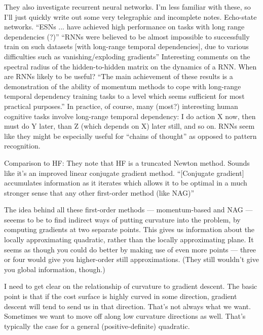 \documentclass[12pt]{report}
\begin{document}
They also investigate recurrent neural networks.  I'm less familiar
with these, so I'll just quickly write out some very telegraphic and
incomplete notes.  Echo-state networks.  ``ESNs ... have achieved high
performance on tasks with long range dependencies (?)''  ``RNNs were
believed to be almost impossible to successfully train on such
datasets [with long-range temporal dependencies], due to various
difficulties such as vanishing/exploding gradients'' Interesting
comments on the spectral radius of the hidden-to-hidden matrix on the
dynamics of a RNN.  When are RNNs likely to be useful?  ``The main
achievement of these results is a demonstration of the ability of
momentum methods to cope with long-range temporal dependency training
tasks to a level which seems sufficient for most practical purposes.''
In practice, of course, many (most?) interesting human cognitive tasks
involve long-range temporal dependency: I do action X now, then must
do Y later, than Z (which depends on X) later still, and so on.  RNNs
seem like they might be especially useful for ``chains of thought'' as
opposed to pattern recognition.

Comparison to HF: They note that HF is a truncated Newton method.
Sounds like it's an improved linear conjugate gradient
method. ``[Conjugate gradient] accumulates information as it iterates
which allows it to be optimal in a much stronger sense that any other
first-order method (like NAG)''

The idea behind all these first-order methods --- momentum-based and
NAG --- seeems to be to find indirect ways of putting curvature into
the problem, by computing gradients at two separate points.  This
gives us information about the locally approximating quadratic, rather
than the locally approximating plane.  It seems as though you could do
better by making use of even more points --- three or four would give
you higher-order still approximations.  (They still wouldn't give you
global information, though.)

I need to get clear on the relationship of curvature to gradient
descent.  The basic point is that if the cost surface is highly curved
in some direction, gradient descent will tend to send us in that
direction.  That's not always what we want.  Sometimes we want to move
off along low curvature directions as well.  That's typically the case
for a general (positive-definite) quadratic.
\end{document}
